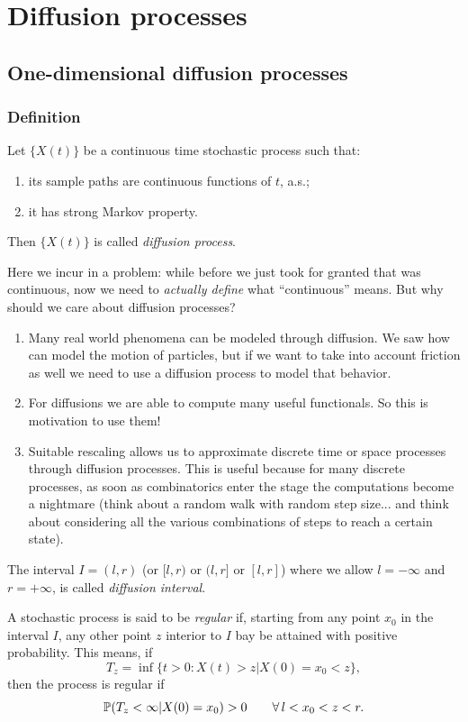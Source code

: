 \documentclass[12pt]{report}
\begin{document}
\chapter{Diffusion processes}
\section{One-dimensional diffusion processes}
\subsection{Definition}
\begin{definition}
	Let $\{X(t)\}$ be a continuous time stochastic process such that:
	\begin{enumerate}
		\item its sample paths are continuous functions of $t$, a.s.;
		\item it has strong Markov property.
	\end{enumerate}
	Then $\{X(t)\}$ is called \emph{diffusion process}.
\end{definition}
Here we incur in a problem: while before we just took for granted that \bwm{} was continuous, now we need to \textit{actually define} what ``continuous'' means. But why should we care about diffusion processes?
\begin{enumerate}
	\item Many real world phenomena can be modeled through diffusion. We saw how \bwm{} can model the motion of particles, but if we want to take into account friction as well we need to use a diffusion process to model that behavior.
	\item For diffusions we are able to compute many useful functionals. So this is motivation to use them!
	\item Suitable rescaling allows us to approximate discrete time or space processes through diffusion processes. This is useful because for many discrete processes, as soon as combinatorics enter the stage the computations become a nightmare (think about a random walk with random step size... and think about considering all the various combinations of steps to reach a certain state).
\end{enumerate}
\begin{definition}
	The interval $I=(l,r)$ (or $[l,r)$ or $(l,r]$ or $[l,r]$) where we allow $l=-\infty$ and $r=+\infty$, is called \emph{diffusion interval}.
\end{definition}
\begin{definition}
	A stochastic process is said to be \emph{regular} if, starting from any point $x_{0}$ in the interval $I$, any other point $z$ interior to $I$ bay be attained with positive probability. This means, if 
	\begin{equation*}
		T_{z}=\inf\{t>0:X(t)>z|X(0)=x_{0}<z\},
	\end{equation*}
	then the process is regular if
	\begin{equation*}
		\mathbb{P}(T_{z}<\infty|X(0)=x_{0})>0\qquad\forall\, l<x_{0}<z<r.
	\end{equation*}
\end{definition}
\end{document}
